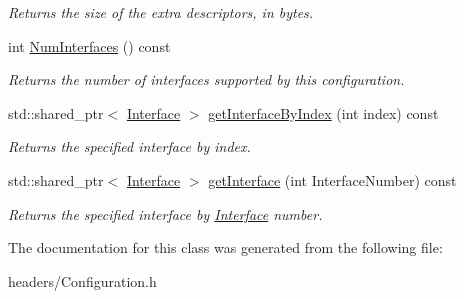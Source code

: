 \begin{DoxyCompactItemize}
\begin{DoxyCompactList}\small\item\em Returns the size of the extra descriptors, in bytes. \end{DoxyCompactList}\item 
\hypertarget{class_lib_u_s_b_1_1_configuration_a833252b95f281c4938693a31f6a71ec6}{int \hyperlink{class_lib_u_s_b_1_1_configuration_a833252b95f281c4938693a31f6a71ec6}{Num\-Interfaces} () const }\label{class_lib_u_s_b_1_1_configuration_a833252b95f281c4938693a31f6a71ec6}

\begin{DoxyCompactList}\small\item\em Returns the number of interfaces supported by this configuration. \end{DoxyCompactList}\item 
\hypertarget{class_lib_u_s_b_1_1_configuration_afd96a0eaf1281c1017ed0c3a781cee10}{std\-::shared\-\_\-ptr$<$ \hyperlink{class_lib_u_s_b_1_1_interface}{Interface} $>$ \hyperlink{class_lib_u_s_b_1_1_configuration_afd96a0eaf1281c1017ed0c3a781cee10}{get\-Interface\-By\-Index} (int index) const }\label{class_lib_u_s_b_1_1_configuration_afd96a0eaf1281c1017ed0c3a781cee10}

\begin{DoxyCompactList}\small\item\em Returns the specified interface by index. \end{DoxyCompactList}\item 
\hypertarget{class_lib_u_s_b_1_1_configuration_af48ff43ff40deb9277f1b20bf232d2fa}{std\-::shared\-\_\-ptr$<$ \hyperlink{class_lib_u_s_b_1_1_interface}{Interface} $>$ \hyperlink{class_lib_u_s_b_1_1_configuration_af48ff43ff40deb9277f1b20bf232d2fa}{get\-Interface} (int Interface\-Number) const }\label{class_lib_u_s_b_1_1_configuration_af48ff43ff40deb9277f1b20bf232d2fa}

\begin{DoxyCompactList}\small\item\em Returns the specified interface by \hyperlink{class_lib_u_s_b_1_1_interface}{Interface} number. \end{DoxyCompactList}\end{DoxyCompactItemize}


The documentation for this class was generated from the following file\-:\begin{DoxyCompactItemize}
\item 
headers/Configuration.\-h\end{DoxyCompactItemize}
